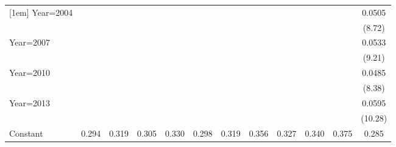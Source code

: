 \begin{table}[htbp]
\begin{tabular}{l*{11}{c}}
[1em]
Year=2004           &                     &                     &                     &                     &                     &                     &                     &                     &                     &                     &      0.0505\sym{***}\\
                    &                     &                     &                     &                     &                     &                     &                     &                     &                     &                     &      (8.72)         \\
[1em]
Year=2007           &                     &                     &                     &                     &                     &                     &                     &                     &                     &                     &      0.0533\sym{***}\\
                    &                     &                     &                     &                     &                     &                     &                     &                     &                     &                     &      (9.21)         \\
[1em]
Year=2010           &                     &                     &                     &                     &                     &                     &                     &                     &                     &                     &      0.0485\sym{***}\\
                    &                     &                     &                     &                     &                     &                     &                     &                     &                     &                     &      (8.38)         \\
[1em]
Year=2013           &                     &                     &                     &                     &                     &                     &                     &                     &                     &                     &      0.0595\sym{***}\\
                    &                     &                     &                     &                     &                     &                     &                     &                     &                     &                     &     (10.28)         \\
[1em]
Constant            &       0.294\sym{***}&       0.319\sym{***}&       0.305\sym{***}&       0.330\sym{***}&       0.298\sym{***}&       0.319\sym{***}&       0.356\sym{***}&       0.327\sym{***}&       0.340\sym{***}&       0.375\sym{***}&       0.285\sym{***}\\

\end{tabular}
\end{table}

